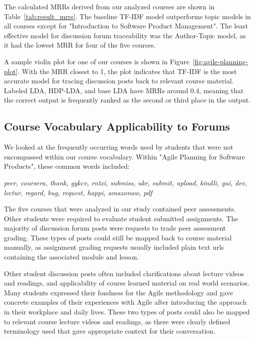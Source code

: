 \documentclass[sigconf, anonymous]{acmart}
\begin{document}
The calculated MRRs derived from our analyzed courses are shown in Table~\ref{tab:result_mrrs}.
The baseline TF-IDF model outperforms topic models in all courses except for "Introduction to Software Product Management".
The least effective model for discussion forum traceability was the Author-Topic model, as it had the lowest MRR for four of the five courses.

A sample violin plot for one of our courses is shown in Figure~\ref{fig:agile-planning-plot}. %
With the MRR closest to 1, the plot indicates that TF-IDF is the most accurate model for tracing discussion posts back to relevant course material.
Labeled LDA, HDP-LDA, and base LDA have MRRs around 0.4, meaning that the correct output is frequently ranked as the second or third place in the output.

\subsection{Course Vocabulary Applicability to Forums}
We looked at the frequently occurring words used by students that were not encompassed within our course vocabulary. Within "Agile Planning for Software Products", these common words included:

\begin{center}
\emph{
    peer, coursera, thank, gykcv, rntxi, submiss, ukr, submit, upload, kindli, gui, dev, lectur, regard, bug, request, happi, amazonaw, pdf
}
\end{center}

The five courses that were analyzed in our study contained peer assessments.
Other students were required to evaluate student submitted assignments.
The majority of discussion forum posts were requests to trade peer assessment grading.
These types of posts could still be mapped back to course material manually, as  assignment grading requests usually included plain text urls containing the associated module and lesson.

Other student discussion posts often included clarifications about lecture videos and readings, and applicability of course learned material on real world scenarios.
Many students expressed their fondness for the Agile methodology and gave concrete examples of their experiences with Agile after introducing the approach in their workplace and daily lives.
These two types of posts could also be mapped to relevant course lecture videos and readings, as there were clearly defined terminology used that gave appropriate context for their conversation.
\end{document}
